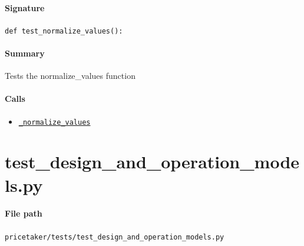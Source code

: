 \documentclass[11pt]{report}
\begin{document}
\paragraph{Signature} \texttt{def test\_normalize\_values():}
\paragraph{Summary} Tests the normalize\_values function
\paragraph{Calls}
\begin{itemize}[leftmargin=*]
  \item \hyperref[def:pricetaker-clustering.py:_normalize_values:L332]{\texttt{\_normalize\_values}}
\end{itemize}

\section{test\_design\_and\_operation\_models.py}
\label{file:pricetaker-tests-test_design_and_operation_models.py}
\paragraph{File path} \texttt{pricetaker/tests/test\_design\_and\_operation\_models.py}
\end{document}
